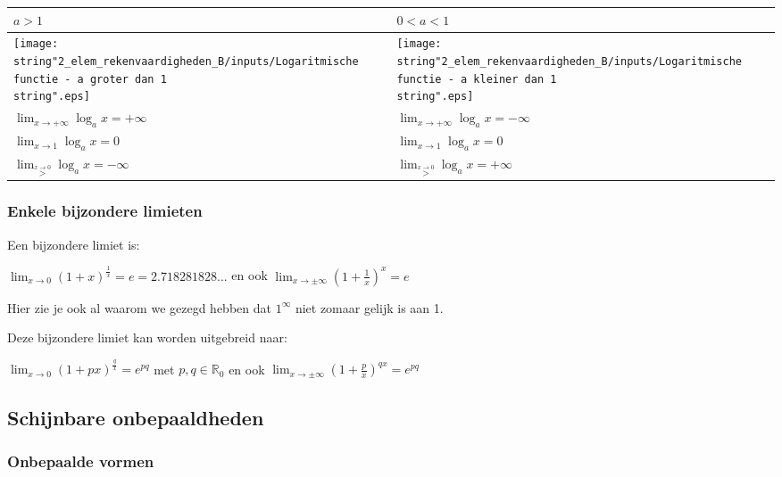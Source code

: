 \begin{table}[ht]
	\centering
	\begin{tabular}{|l||l|}
		\hline 
		$a>1$ & $0<a<1$\\
		\hline 
		\texttt{[image: \\string"2\_elem\_rekenvaardigheden\_B/inputs/Logaritmische functie - a groter dan 1\\string".eps]} & \texttt{[image: \\string"2\_elem\_rekenvaardigheden\_B/inputs/Logaritmische functie - a kleiner dan 1\\string".eps]}\\
		\hline 
		${\displaystyle \lim_{x\to+\infty}}\log_{a}x=+\infty$ & ${\displaystyle \lim_{x\to+\infty}}\log_{a}x=-\infty$\\
		\hline 
		${\displaystyle \lim_{x\to1}}\log_{a}x=0$ & ${\displaystyle \lim_{x\to1}}\log_{a}x=0$\\
		\hline 
		${\displaystyle \lim_{\overset{x\rightarrow0}{>}}}\log_{a}x=-\infty$ & ${\displaystyle \lim_{\overset{x\rightarrow0}{>}}}\log_{a}x=+\infty$\\
		\hline 
	\end{tabular}
\end{table}



\subsubsection{Enkele bijzondere limieten}

Een bijzondere limiet is:

${\displaystyle \lim_{x\to0}}\left(1+x\right)^{\frac{1}{x}}=e=2.718281828...$
en ook ${\displaystyle \lim_{x\to\pm\infty}}\left(1+\frac{1}{x}\right)^{x}=e$

\medskip{}


\noindent Hier zie je ook al waarom we gezegd hebben dat $1^{\infty}$
niet zomaar gelijk is aan 1.

\noindent \medskip{}


\noindent Deze bijzondere limiet kan worden uitgebreid naar:

${\displaystyle \lim_{x\to0}}\left(1+px\right)^{\frac{q}{x}}=e^{pq}$
met $p,q\in\mathbb{R}_{0}$ en ook ${\displaystyle \lim_{x\to\pm\infty}}\left(1+\frac{p}{x}\right)^{qx}=e^{pq}$


\subsection{Schijnbare onbepaaldheden}

\subsubsection{Onbepaalde vormen}

